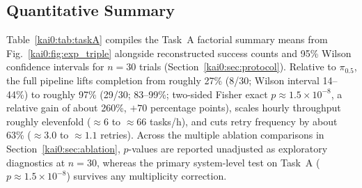 \subsection{Quantitative Summary}\label{kai0:sec:exp_quant}
Table~\ref{kai0:tab:taskA} compiles the Task~A factorial summary means from Fig.~\ref{kai0:fig:exp_triple} alongside reconstructed success counts and 95\% Wilson confidence intervals for $n = 30$ trials (Section~\ref{kai0:sec:protocol}). Relative to $\pi_{0.5}$, the full \chiz pipeline lifts completion from roughly 27\% (8/30; Wilson interval 14--44\%) to roughly 97\% (29/30; 83--99\%; two-sided Fisher exact $p \approx 1.5 \times 10^{-8}$, a relative gain of about 260\%, $+70$ percentage points), scales hourly throughput roughly elevenfold ($\approx 6$ to $\approx 66$ tasks/h), and cuts retry frequency by about 63\% ($\approx 3.0$ to $\approx 1.1$ retries). Across the multiple ablation comparisons in Section~\ref{kai0:sec:ablation}, $p$-values are reported unadjusted as exploratory diagnostics at $n=30$, whereas the primary system-level test on Task~A ($p \approx 1.5 \times 10^{-8}$) survives any multiplicity correction.

